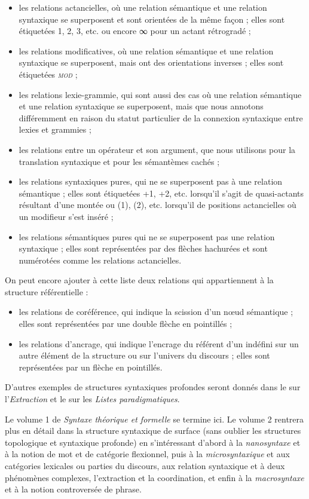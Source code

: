 \begin{itemize}
\item	les relations actancielles, où une relation sémantique et une relation syntaxique se superposent et sont orientées de la même façon ; elles sont étiquetées 1, 2, 3, etc. ou encore ∞ pour un actant rétrogradé ;
\item	les relations modificatives, où une relation sémantique et une relation syntaxique se superposent, mais ont des orientations inverses ; elles sont étiquetées \textit{\textsc{mod}} ;
\item	les relations lexie-grammie, qui sont aussi des cas où une relation sémantique et une relation syntaxique se superposent, mais que nous annotons différemment en raison du statut particulier de la connexion syntaxique entre lexies et grammies ;
\item	les relations entre un opérateur et son argument, que nous utilisons pour la translation syntaxique et pour les sémantèmes cachés ;
\item	les relations syntaxiques pures, qui ne se superposent pas à une relation sémantique ; elles sont étiquetées +1, +2, etc. lorsqu'il s'agit de quasi-actants résultant d'une montée ou (1), (2), etc. lorsqu'il de positions actancielles où un modifieur s'est inséré ;
\item	les relations sémantiques pures qui ne se superposent pas une relation syntaxique ; elles sont représentées par des flèches hachurées et sont numérotées comme les relations actancielles.
\end{itemize}

On peut encore ajouter à cette liste deux relations qui appartiennent à la structure référentielle :

\begin{itemize}
\item	les relations de coréférence, qui indique la scission d’un nœud sémantique ; elles sont représentées par une double flèche en pointillés ;
\item	les relations d’ancrage, qui indique l’encrage du référent d’un indéfini sur un autre élément de la structure ou sur l’univers du discours ; elles sont représentées par un flèche en pointillés.
\end{itemize}

D’autres exemples de structures syntaxiques profondes seront donnés dans le  sur l’\textit{Extraction} et le  sur les \textit{Listes paradigmatiques}.

Le volume 1  de \textit{Syntaxe théorique et formelle} se termine ici. Le volume 2 rentrera plus en détail dans la structure syntaxique de surface (sans oublier les structures topologique et syntaxique profonde) en s’intéressant d’abord à la \textit{nanosyntaxe} et à la notion de mot et de catégorie flexionnel, puis à la \textit{microsyntaxique} et aux catégories lexicales ou parties du discours, aux relation syntaxique et à deux phénomènes complexes, l’extraction et la coordination, et enfin à la \textit{macrosyntaxe} et à la notion controversée de phrase.


